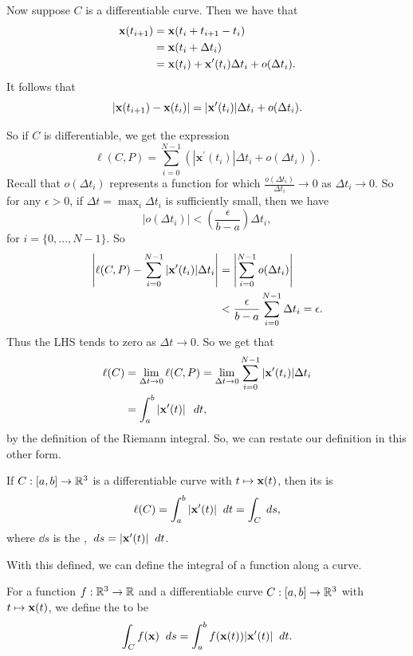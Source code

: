 \documentclass[a4paper]{scrartcl}
\begin{document}
Now suppose $C$ is a differentiable curve. Then we have that
\begin{align*}
	\mathbf{x}(t_{i + 1}) &= \mathbf{x}(t_i + t_{i + 1} - t_i) \\
					&= \mathbf{x}(t_i + \Delta t_i) \\
					&= \mathbf{x}(t_i) + \mathbf{x}'(t_i) \Delta t_i + o(\Delta t_i).
\end{align*}
It follows that
$$
|\mathbf{x}(t_{i + 1}) - \mathbf{x}(t_i) | = |\mathbf{x}'(t_i)| \Delta t_i + o(\Delta t_i). 
$$

So if $C$ is differentiable, we get the expression
$$
\ell(C, P)=\sum_{i=0}^{N-1}\left(\left|\mathbf{x}^{\prime}\left(t_{i}\right)\right| \Delta t_{i}+o\left(\Delta t_{i}\right)\right).
$$
Recall that $o(\Delta t_i)$ represents a function for which $\frac{o(\Delta t_i)}{\Delta t_i} \rightarrow 0$ as $\Delta t_i \rightarrow 0$. So for any $\epsilon > 0$, if $\Delta t = \max_i \Delta t_i$  is sufficiently small, then we have
$$
|o(\Delta t_i) | < \left(\frac{\epsilon}{b - a}\right) \Delta t_i,
$$
for $i = \{0, \dots, N - 1\}$. So
\begin{align*}
	\left|\ell(C, P) - \sum_{i = 0}^{N - 1} |\mathbf{x}' (t_i)| \Delta t_i \right| &= \left|\sum_{i = 0}^{N - 1} o(\Delta t_i)\right| \\
	&< \frac{\epsilon}{b - a} \sum_{i = 0}^{N - 1} \Delta{t_i} = \epsilon.
\end{align*}
Thus the LHS tends to zero as $\Delta t \rightarrow 0$. So we get that
\begin{align*}
	\ell(C) &= \lim_{\Delta t \to 0} \ell(C, P) = \lim_{\Delta t \to 0} \sum_{i = 0}^{N - 1} |\mathbf{x}'(t_i)| \Delta t_i \\
		&= \int_a^b \left|\mathbf{x}'(t)\right| \; \; d t,
\end{align*}
by the definition of the Riemann integral.
So, we can restate our definition in this other form.

\begin{definition}
	If $C: [a, b] \rightarrow \mathbb{R}^3$ is a differentiable curve with $t \mapsto \mathbf{x}(t)$, then its  is
	$$
	\ell(C) = \int_a^b |\mathbf{x}'(t)| \; \; d t = \int_C \; d s,
	$$
where $\dd s$ is the , $\; d s = |\mathbf{x}'(t)| \; \; d t$.
\end{definition}

With this defined, we can define the integral of a function along a curve.

\begin{definition}
	For a function $f : \mathbb{R}^3 \rightarrow \mathbb{R}$ and a differentiable curve $C: [a, b] \rightarrow \mathbb{R}^3$ with $t \mapsto \mathbf{x}(t)$, we define the  to be
	$$
	\int_C f(\mathbf{x})\; \; d s = \int_a^b f(\mathbf{x}(t)) |\mathbf{x}'(t)| \; \; d t.
	$$
\end{definition}
\end{document}
